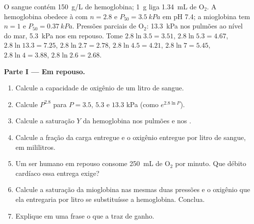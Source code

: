 \begin{problem}
\label{pb:b1:proteins:1}
O sangue contém \qty{150}{g/L} de hemoglobina; \qty{1}{g} liga
\qty{1.34}{mL} de $\mathrm{O_2}$. A hemoglobina obedece à  com $n = 2.8$ e $P_{50} = \qty{3.5}{kPa}$ em pH 7.4; a mioglobina
tem $n = 1$ e $P_{50} = \qty{0.37}{kPa}$. Pressões parciais de
$\mathrm{O_2}$: \qty{13.3}{kPa} nos pulmões ao nível do mar,
\qty{5.3}{kPa} nos  em repouso. Tome $2.8\ln 3.5 = 3.51$,
$2.8\ln 5.3 = 4.67$, $2.8\ln 13.3 = 7.25$, $2.8\ln 2.7 = 2.78$,
$2.8\ln 4.5 = 4.21$, $2.8\ln 7 = 5.45$, $2.8\ln 4 = 3.88$,
$2.8\ln 2.6 = 2.68$.

\medskip
\noindent\textbf{Parte I --- Em repouso.}
\begin{enumerate}
  \item Calcule a capacidade de oxigênio de um litro de sangue.
  \item Calcule $P^{2.8}$ para $P = 3.5$, $5.3$ e $13.3$ kPa (como
        $e^{2.8\ln P}$).
  \item Calcule a saturação $Y$ da hemoglobina nos pulmões e nos
        .
  \item Calcule a fração da carga entregue e o oxigênio entregue por
        litro de sangue, em mililitros.
  \item Um ser humano em repouso consome \qty{250}{mL} de $\mathrm{O_2}$
        por minuto. Que débito cardíaco essa entrega exige?
  \item Calcule a saturação da mioglobina nas mesmas duas pressões e o
        oxigênio que ela entregaria por litro se substituísse a
        hemoglobina. Conclua.
  \item Explique em uma frase o que a  traz de ganho.
\end{enumerate}


\end{problem}
